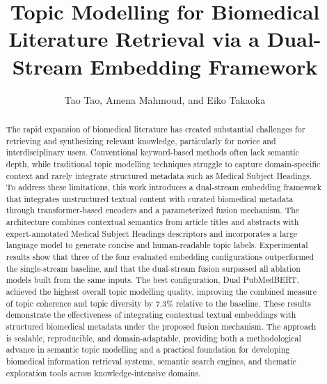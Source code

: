 \documentclass[authorproof,JACIII,researchpaper]{fujipressarticle}
\begin{document}
\pagestyle{fujipressstyle}

\title{Topic Modelling for Biomedical Literature Retrieval via a Dual-Stream Embedding Framework}
\author{Tao Tao, Amena Mahmoud, and Eiko Takaoka}
\address{Graduate School of Science and Technology, Sophia University, Tokyo 102-8554, Japan\\
Department of Computer Science, Faculty of Computers and Information, Kafrelsheikh University, Kafrelsheikh 33516, Egypt\\
E-mail: c2578666@eagle.sophia.ac.jp, m-g-eiko@sophia.ac.jp}
\maketitle


\begin{abstract}%
\noindent The rapid expansion of biomedical literature has created substantial challenges for retrieving and synthesizing relevant knowledge, particularly for novice and interdisciplinary users. Conventional keyword-based methods often lack semantic depth, while traditional topic modelling techniques struggle to capture domain-specific context and rarely integrate structured metadata such as Medical Subject Headings. To address these limitations, this work introduces a dual-stream embedding framework that integrates unstructured textual content with curated biomedical metadata through transformer-based encoders and a parameterized fusion mechanism. The architecture combines contextual semantics from article titles and abstracts with expert-annotated Medical Subject Headings descriptors and incorporates a large language model to generate concise and human-readable topic labels. Experimental results show that three of the four evaluated embedding configurations outperformed the single-stream baseline, and that the dual-stream fusion surpassed all ablation models built from the same inputs. The best configuration, Dual PubMedBERT, achieved the highest overall topic modelling quality, improving the combined measure of topic coherence and topic diversity by 7.3\% relative to the baseline. These results demonstrate the effectiveness of integrating contextual textual embeddings with structured biomedical metadata under the proposed fusion mechanism. The approach is scalable, reproducible, and domain-adaptable, providing both a methodological advance in semantic topic modelling and a practical foundation for developing biomedical information retrieval systems, semantic search engines, and thematic exploration tools across knowledge-intensive domains.
\end{abstract}
\end{document}
